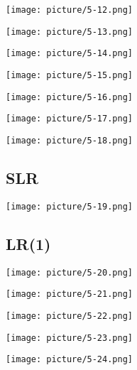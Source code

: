 \documentclass[UTF8]{article}
\begin{document}
  \texttt{[image: picture/5-12.png]} 

  \texttt{[image: picture/5-13.png]} 

  \texttt{[image: picture/5-14.png]} 

  \texttt{[image: picture/5-15.png]} 

  \texttt{[image: picture/5-16.png]} 

  \texttt{[image: picture/5-17.png]} 

  \texttt{[image: picture/5-18.png]} 
  
  \subsection{SLR}%
  \label{sub:slr}
  
  \texttt{[image: picture/5-19.png]} 
  
  \subsection{LR(1)}%
  \label{sub:lr_1_}

  \texttt{[image: picture/5-20.png]} 

  \texttt{[image: picture/5-21.png]} 

  \texttt{[image: picture/5-22.png]} 

  \texttt{[image: picture/5-23.png]} 

  \texttt{[image: picture/5-24.png]} 
  
  
\end{document}
